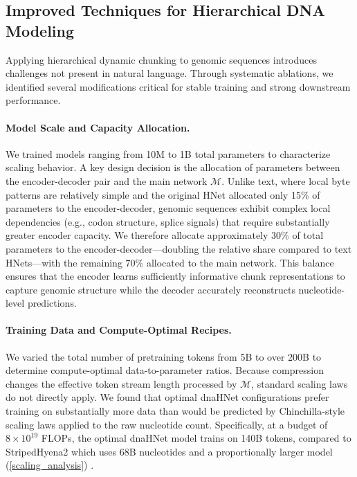 \documentclass{article}
\theoremstyle{plain}
\theoremstyle{definition}
\theoremstyle{remark}
\begin{document}
\subsection{Improved Techniques for Hierarchical DNA Modeling}
\label{sec:techniques}

Applying hierarchical dynamic chunking to genomic sequences introduces challenges not present in natural language. Through systematic ablations, we identified several modifications critical for stable training and strong downstream performance.

\paragraph{Model Scale and Capacity Allocation.}
We trained models ranging from 10M to 1B total parameters to characterize scaling behavior. A key design decision is the allocation of parameters between the encoder-decoder pair and the main network $\mathcal{M}$. Unlike text, where local byte patterns are relatively simple and the original HNet allocated only 15\% of parameters to the encoder-decoder, genomic sequences exhibit complex local dependencies (e.g., codon structure, splice signals) that require substantially greater encoder capacity. We therefore allocate approximately 30\% of total parameters to the encoder-decoder—doubling the relative share compared to text HNets—with the remaining 70\% allocated to the main network. This balance ensures that the encoder learns sufficiently informative chunk representations to capture genomic structure while the decoder accurately reconstructs nucleotide-level predictions.


\paragraph{Training Data and Compute-Optimal Recipes.}
We varied the total number of pretraining tokens from 5B to over 200B to determine compute-optimal data-to-parameter ratios. Because compression changes the effective token stream length processed by $\mathcal{M}$, standard scaling laws \citep{kaplan2020scalinglawsneurallanguage} do not directly apply. We found that optimal dnaHNet configurations prefer training on substantially more data than would be predicted by Chinchilla-style scaling laws \citep{hoffmann2022trainingcomputeoptimallargelanguage} applied to the raw nucleotide count. Specifically, at a budget of $8\times10^{19}$ FLOPs, the optimal dnaHNet model trains on 140B tokens, compared to StripedHyena2 which uses 68B nucleotides and a proportionally larger model (\cref{scaling_analysis}) \citep{ku2025systemsalgorithmsconvolutionalmultihybrid}.
\end{document}
